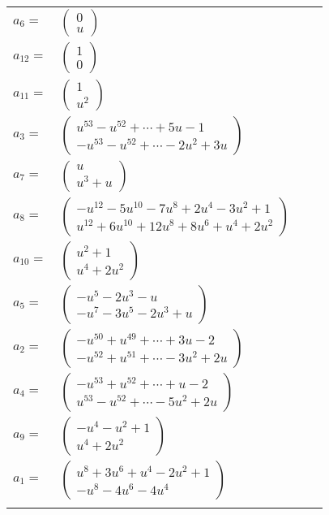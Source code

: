 \documentclass[1p]{elsarticle_modified}
\theoremstyle{definition}
\begin{document}
\begin{tabular}{m{7pt} m{180pt} m{7pt} m{180pt} }
\flushright $a_{6}=$&$\begin{pmatrix}0\\u\end{pmatrix}$ \\
\flushright $a_{12}=$&$\begin{pmatrix}1\\0\end{pmatrix}$ \\
\flushright $a_{11}=$&$\begin{pmatrix}1\\u^2\end{pmatrix}$ \\
\flushright $a_{3}=$&$\begin{pmatrix}u^{53}- u^{52}+\cdots+5 u-1\\- u^{53}- u^{52}+\cdots-2 u^2+3 u\end{pmatrix}$ \\
\flushright $a_{7}=$&$\begin{pmatrix}u\\u^3+u\end{pmatrix}$ \\
\flushright $a_{8}=$&$\begin{pmatrix}- u^{12}-5 u^{10}-7 u^8+2 u^4-3 u^2+1\\u^{12}+6 u^{10}+12 u^8+8 u^6+u^4+2 u^2\end{pmatrix}$ \\
\flushright $a_{10}=$&$\begin{pmatrix}u^2+1\\u^4+2 u^2\end{pmatrix}$ \\
\flushright $a_{5}=$&$\begin{pmatrix}- u^5-2 u^3- u\\- u^7-3 u^5-2 u^3+u\end{pmatrix}$ \\
\flushright $a_{2}=$&$\begin{pmatrix}- u^{50}+u^{49}+\cdots+3 u-2\\- u^{52}+u^{51}+\cdots-3 u^2+2 u\end{pmatrix}$ \\
\flushright $a_{4}=$&$\begin{pmatrix}- u^{53}+u^{52}+\cdots+u-2\\u^{53}- u^{52}+\cdots-5 u^2+2 u\end{pmatrix}$ \\
\flushright $a_{9}=$&$\begin{pmatrix}- u^4- u^2+1\\u^4+2 u^2\end{pmatrix}$ \\
\flushright $a_{1}=$&$\begin{pmatrix}u^8+3 u^6+u^4-2 u^2+1\\- u^8-4 u^6-4 u^4\end{pmatrix}$\\&\end{tabular}
\end{document}

